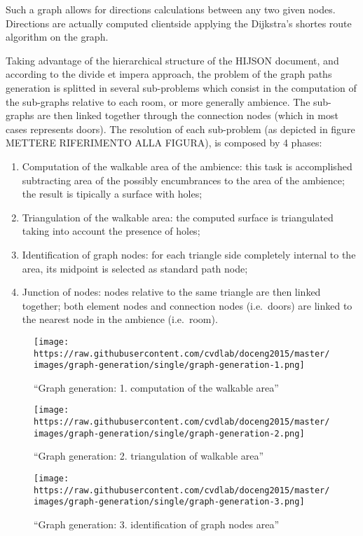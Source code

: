 \documentclass[]{article}
\begin{document}
Such a graph allows for directions calculations between any two given
nodes. Directions are actually computed clientside applying the
Dijkstra's shortes route algorithm on the graph.

Taking advantage of the hierarchical structure of the HIJSON document,
and according to the divide et impera approach, the problem of the graph
paths generation is splitted in several sub-problems which consist in
the computation of the sub-graphs relative to each room, or more
generally ambience. The sub-graphs are then linked together through the
connection nodes (which in most cases represents doors). The resolution
of each sub-problem (as depicted in figure METTERE RIFERIMENTO ALLA
FIGURA), is composed by 4 phases:

\begin{enumerate}
\def\labelenumi{\arabic{enumi}.}
\itemsep1pt\parskip0pt
\item
  Computation of the walkable area of the ambience: this task is
  accomplished subtracting area of the possibly encumbrances to the area
  of the ambience; the result is tipically a surface with holes;
\item
  Triangulation of the walkable area: the computed surface is
  triangulated taking into account the presence of holes;
\item
  Identification of graph nodes: for each triangle side completely
  internal to the area, its midpoint is selected as standard path node;
\item
  Junction of nodes: nodes relative to the same triangle are then linked
  together; both element nodes and connection nodes (i.e.~doors) are
  linked to the nearest node in the ambience (i.e.~room).
\end{enumerate}

\begin{figure}[htbp]
\centering
\texttt{[image: https://raw.githubusercontent.com/cvdlab/doceng2015/master/images/graph-generation/single/graph-generation-1.png]}
\caption{``Graph generation: 1. computation of the walkable area''}
\end{figure}

\begin{figure}[htbp]
\centering
\texttt{[image: https://raw.githubusercontent.com/cvdlab/doceng2015/master/images/graph-generation/single/graph-generation-2.png]}
\caption{``Graph generation: 2. triangulation of walkable area''}
\end{figure}

\begin{figure}[htbp]
\centering
\texttt{[image: https://raw.githubusercontent.com/cvdlab/doceng2015/master/images/graph-generation/single/graph-generation-3.png]}
\caption{``Graph generation: 3. identification of graph nodes area''}
\end{figure}
\end{document}
